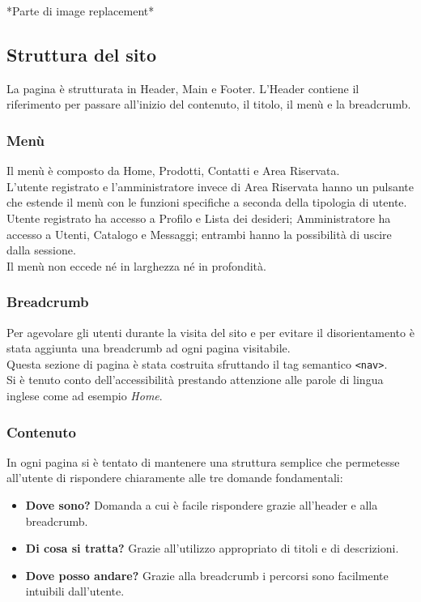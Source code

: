 \documentclass[a4paper, 11pt]{article}
\begin{document}
*Parte di image replacement*

\subsection{Struttura del sito}

La pagina è strutturata in Header, Main e Footer. L’Header contiene il riferimento per passare all’inizio del contenuto, il titolo, il menù e la breadcrumb. \\

\subsubsection{Menù}
Il menù è composto da Home, Prodotti, Contatti e Area Riservata. \\
\vspace{3px}
L’utente registrato e l’amministratore invece di Area Riservata hanno un pulsante che estende il menù con le funzioni specifiche a seconda della tipologia di utente.  \\
\vspace{3px}
Utente registrato ha accesso a Profilo e Lista dei desideri; Amministratore ha accesso a Utenti, Catalogo e Messaggi; entrambi hanno la possibilità di uscire dalla sessione.  \\
\vspace{3px}
Il menù non eccede né in larghezza né in profondità.

\subsubsection{Breadcrumb}
Per agevolare gli utenti durante la visita del sito e per evitare il disorientamento è stata aggiunta una breadcrumb ad ogni pagina visitabile. \\
Questa sezione di pagina è stata costruita sfruttando il tag semantico \texttt{<nav>}.  \\
Si è tenuto conto dell'accessibilità prestando attenzione alle parole di lingua inglese come ad esempio \textit{Home}.

\subsubsection{Contenuto} 
In ogni pagina si è tentato di mantenere una struttura semplice che permetesse all'utente di rispondere chiaramente alle tre domande fondamentali:
  \begin{itemize}
        \item \textbf{Dove sono?} Domanda a cui è facile rispondere grazie all'header e alla breadcrumb.
        \item \textbf{Di cosa si tratta?} Grazie all'utilizzo appropriato di titoli e di descrizioni.
        \item \textbf{Dove posso andare?} Grazie alla breadcrumb i percorsi sono facilmente intuibili dall'utente.
    \end{itemize}
    
\end{document}
